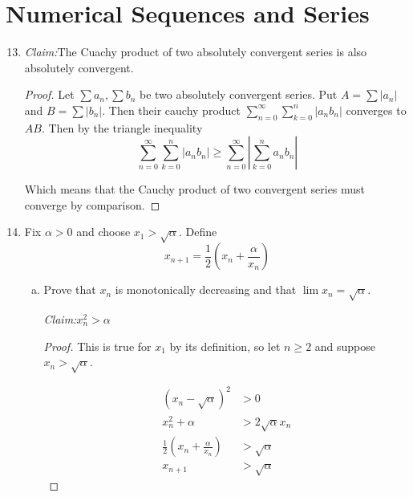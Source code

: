 \documentclass{article}
\begin{document}
\newcommand{\R}{\mathbb{R}}
\newcommand{\claim}{\par\noindent\textit{Claim:}\space}

\setcounter{section}{2}
\section{Numerical Sequences and Series}

\begin{enumerate}
\setcounter{enumi}{12}
\item \claim The Cuachy product of two absolutely convergent series is also
      absolutely convergent.

\begin{proof}
Let $\sum a_n, \sum b_n$ be two absolutely convergent series. Put
$A = \sum |a_n|$ and $B = \sum |b_n|$. Then their cauchy product
$\sum_{n=0}^{\infty} \sum_{k=0}^n |a_n b_n|$ converges to $AB$. Then by the
triangle inequality
\begin{equation*}
\sum_{n=0}^{\infty} \sum_{k=0}^n | a_n b_n | \geq
\sum_{n=0}^{\infty} \left| \sum_{k=0}^n a_n b_n \right|
\end{equation*}

Which means that the Cauchy product of two convergent series must converge by
comparison.
\end{proof}

\setcounter{enumi}{15}
\item Fix $\alpha > 0$ and choose $x_1 > \sqrt{\alpha}$. Define
\begin{equation*}
x_{n+1} = \frac{1}{2} \left(x_n + \frac{\alpha}{x_n}\right)
\end{equation*}
\begin{enumerate}[a.]
\item Prove that $x_n$ is monotonically decreasing and that
      $\lim x_n = \sqrt{\alpha}$.

\claim $x_n^2 > \alpha$
\begin{proof}
This is true for $x_1$ by its definition, so let $n \geq 2$ and suppose
$x_n > \sqrt{\alpha}$.

\begin{equation*}
\begin{split}
(x_n - \sqrt{\alpha})^2 &> 0 \\
x_n^2 + \alpha &> 2\sqrt{\alpha} x_n \\
\frac{1}{2}\left(x_n + \frac{\alpha}{x_n}\right) &> \sqrt{\alpha} \\
x_{n+1} &> \sqrt{\alpha}
\end{split}
\end{equation*}
\end{proof}


\end{enumerate}
\end{enumerate}
\end{document}
